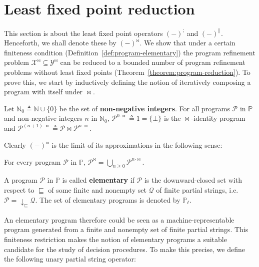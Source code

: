 \documentclass{llncs}
\newcommand{\set}[1]{\mbox{$\{ #1 \}$}}
\newcommand{\deq}{\triangleq}
\newcommand{\nats}{\mathbb{N}}
\newcommand{\cP}{\mathcal{P}}
\newcommand{\cQ}{\mathcal{Q}}
\newcommand{\cX}{\mathcal{X}}
\newcommand{\cY}{\mathcal{Y}}
\newcommand{\bbP}{\mathbb{P}}
\newcommand{\defn}[1]{\textbf{#1}}
\begin{document}
\section{Least fixed point reduction}
\vspace{-0.3em}
\label{label:least-fixed-point-reduction}

This section is about the least fixed point operators $(-)^;$ and $(-)^\parallel$. Henceforth, we shall denote these by $(-)^{\Join}$. We show that under a certain finiteness condition (Definition~\ref{def:program-elementary}) the program refinement problem $\cX^{\Join} \subseteq \cY^{\Join}$ can be reduced to a bounded number of program refinement problems without least fixed points (Theorem~\ref{theorem:program-reduction}). To prove this, we start by inductively defining the notion of iteratively composing a program with itself under $\Join$.

\begin{definition}
\label{def:program-n-iterated-composition}
Let $\nats_0 \deq \nats \cup \set{0}$ be the set of \defn{non-negative integers}. For all programs $\cP$ in $\bbP$ and non-negative integers $n$ in $\nats_0$, $\cP^{0 \cdot \Join} \deq 1 = \set{\bot}$ is the $\Join$-identity program and $\cP^{(n+1) \cdot \Join} \deq \cP \Join \cP^{n \cdot \Join}$.
\end{definition}

Clearly $(-)^{\Join}$ is the limit of its approximations in the following sense:

\begin{proposition}
\label{proposition:program-least-fixed-point-as-n-iterated-composition}
For every program $\cP$ in $\bbP$, $\cP^{\Join} = \bigcup_{n \ge 0} \cP^{n \cdot \Join}$.
\end{proposition}


\begin{definition}
\label{def:program-elementary}
A program $\cP$ in $\bbP$ is called \defn{elementary} if $\cP$ is the downward-closed set with respect to $\sqsubseteq$ of some finite and nonempty set $\cQ$ of finite partial strings, i.e. $\cP = \downarrow_\sqsubseteq \cQ$. The set of elementary programs is denoted by $\bbP_\ell$.
\end{definition}

An elementary program therefore could be seen as a machine-representable program generated from a finite and nonempty set of finite partial strings. This finiteness restriction makes the notion of elementary programs a suitable candidate for the study of decision procedures. To make this precise, we define the following unary partial string operator:
\end{document}
